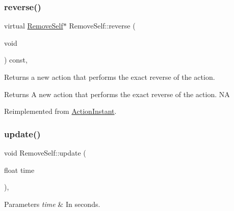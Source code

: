 \mbox{\label{classRemoveSelf_a5bd57faed537125c8f7db63d9dad293f}} 
\subsubsection{\texorpdfstring{reverse()}{reverse()}\hspace{0.1cm}{\footnotesize\ttfamily [2/2]}}
{\footnotesize\ttfamily virtual \hyperlink{classRemoveSelf}{Remove\+Self}$\ast$ Remove\+Self\+::reverse (\begin{DoxyParamCaption}\item[{void}]{ }\end{DoxyParamCaption}) const\hspace{0.3cm}{\ttfamily [override]}, {\ttfamily [virtual]}}

Returns a new action that performs the exact reverse of the action.

\begin{DoxyReturn}{Returns}
A new action that performs the exact reverse of the action.  NA 
\end{DoxyReturn}


Reimplemented from \hyperlink{classActionInstant_aeb1870802c509e1f4111c863a28e9262}{Action\+Instant}.

\mbox{\label{classRemoveSelf_a362b4453b4b247e9b4b7e51fc1bd7c44}} 
\subsubsection{\texorpdfstring{update()}{update()}\hspace{0.1cm}{\footnotesize\ttfamily [1/2]}}
{\footnotesize\ttfamily void Remove\+Self\+::update (\begin{DoxyParamCaption}\item[{float}]{time }\end{DoxyParamCaption})\hspace{0.3cm}{\ttfamily [override]}, {\ttfamily [virtual]}}


\begin{DoxyParams}{Parameters}
{\em time} & In seconds. \\
\hline
\end{DoxyParams}


